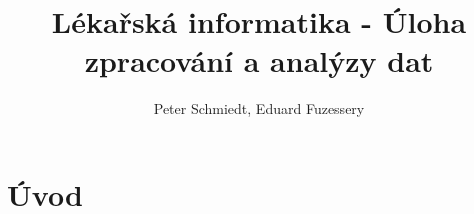 \documentclass[11pt]{article}
\author{Peter Schmiedt, Eduard Fuzessery}
\title{Lékařská informatika - Úloha zpracování a analýzy dat}
\begin{document}
\begin{titlepage}
	\maketitle
\end{titlepage}



\section{Úvod}
\end{document}
